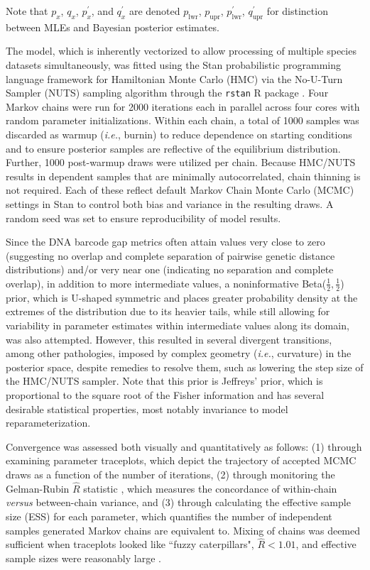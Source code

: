 \documentclass[12pt]{article}
\begin{document}
\noindent Note that $p_x$, $q_x$, $p^{'}_x$, and $q^{'}_x$ are denoted $p_\mathrm{lwr}$, $p_\mathrm{upr}$, $p^{'}_\mathrm{lwr}$, $q^{'}_\mathrm{upr}$ for distinction between MLEs and Bayesian posterior estimates.

The model, which is inherently vectorized to allow processing of multiple species datasets simultaneously, was fitted using the Stan probabilistic programming language  \citep{carpenter2017stan} framework for Hamiltonian Monte Carlo (HMC) via the No-U-Turn Sampler (NUTS) sampling algorithm \citep{hoffman2014no} through the {\tt rstan} R package \citep{stan2023rstan}. Four Markov chains were run for 2000 iterations each in parallel across four cores with random parameter initializations. Within each chain, a total of 1000 samples was discarded as warmup (\textit{i.e.}, burnin) to reduce dependence on starting conditions and to ensure posterior samples are reflective of the equilibrium distribution. Further, 1000 post-warmup draws were utilized per chain. Because HMC/NUTS results in dependent samples that are minimally autocorrelated, chain thinning is not required. Each of these reflect default Markov Chain Monte Carlo (MCMC) settings in Stan to control both bias and variance in the resulting draws. A random seed was set to ensure reproducibility of model results.

Since the DNA barcode gap metrics often attain values very close to zero (suggesting no overlap and complete separation of pairwise genetic distance distributions) and/or very near one (indicating no separation and complete overlap), in addition to more intermediate values, a noninformative Beta($\frac{1}{2}, \frac{1}{2}$) prior, which is U-shaped symmetric and places greater probability density at the extremes of the distribution due to its heavier tails, while still allowing for variability in parameter estimates within intermediate values along its domain, was also attempted. However, this resulted in several divergent transitions, among other pathologies, imposed by complex geometry (\textit{i.e.}, curvature) in the posterior space, despite remedies to resolve them, such as lowering the step size of the HMC/NUTS sampler. Note that this prior is Jeffreys' prior, which is proportional to the square root of the Fisher information and has several desirable statistical properties, most notably invariance to model reparameterization. 

Convergence was assessed both visually and quantitatively as follows: (1) through \\ examining parameter traceplots, which depict the trajectory of accepted MCMC draws as a function of the number of iterations, (2) through monitoring the Gelman-Rubin $\hat{R}$ statistic \citep{gelman1992iterative, vehtari2017rank}, which measures the concordance of within-chain \textit{versus} between-chain variance, and (3) through calculating the effective sample size (ESS) for each parameter, which quantifies the number of independent samples generated Markov chains are equivalent to. Mixing of chains was deemed sufficient when traceplots looked like ``fuzzy caterpillars", $\hat{R} < 1.01$, and effective sample sizes were reasonably large \citep{gelman2020bayesian}.
\end{document}
